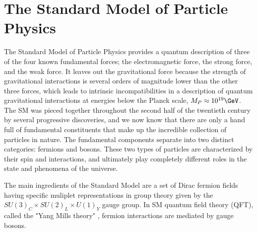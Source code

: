\section{The Standard Model of Particle Physics}
\label{sec:sm}
The Standard Model of Particle Physics provides a quantum description of three of the four known fundamental forces; the electromagnetic force, the strong force, and the weak force.  It leaves out the gravitational force because the strength of gravitational interactions is several orders of magnitude lower than the other three forces, which leads to intrinsic incompatibilities in a description of quantum gravitational interactions at energies below the Planck scale, $M_P\approx10^{19}\GeV$.  The SM was pieced together throughout the second half of the twentieth century by several progressive discoveries, and we now know that there are only a hand full of fundamental constituents that make up the incredible collection of particles in nature.  The fundamental components separate into two distinct categories: fermions and bosons.  These two types of particles are characterized by their spin and interactions, and ultimately play completely different roles in the state and phenomena of the universe. \cite{tully}

The main ingredients of the Standard Model are a set of Dirac fermion fields having specific muliplet representations in group theory given by the $SU(3)_{C} \times SU(2)_{L} \times U(1)_{Y}$ gauge group.  In SM quantum field theory (QFT), called the "Yang Mills theory" \cite{PhysRev.96.191}, fermion interactions are mediated by gauge bosons.  %

